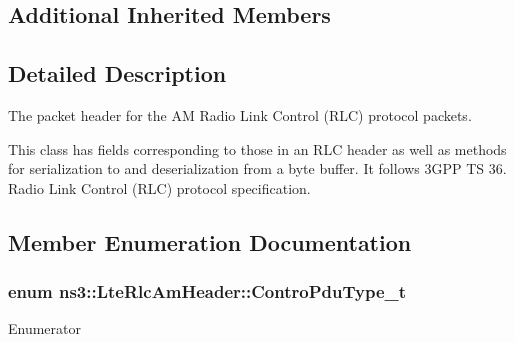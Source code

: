 \subsection*{Additional Inherited Members}


\subsection{Detailed Description}
The packet header for the AM Radio Link Control (R\+LC) protocol packets. 

This class has fields corresponding to those in an R\+LC header as well as methods for serialization to and deserialization from a byte buffer. It follows 3\+G\+PP TS 36. Radio Link Control (R\+LC) protocol specification. 

\subsection{Member Enumeration Documentation}
\subsubsection[{\texorpdfstring{Contro\+Pdu\+Type\+\_\+t}{ControPduType_t}}]{\setlength{\rightskip}{0pt plus 5cm}enum {\bf ns3\+::\+Lte\+Rlc\+Am\+Header\+::\+Contro\+Pdu\+Type\+\_\+t}}\hypertarget{classns3_1_1LteRlcAmHeader_a91ebd7f63ef09e33d7755c660add464e}{}\label{classns3_1_1LteRlcAmHeader_a91ebd7f63ef09e33d7755c660add464e}
\begin{Desc}
\item[Enumerator]\par
\begin{description}
\item[{\em 
S\+T\+A\+T\+U\+S\+\_\+\+P\+DU\hypertarget{classns3_1_1LteRlcAmHeader_a91ebd7f63ef09e33d7755c660add464ea2d662e6a06cefca8c790c83cc2f5ed95}{}\label{classns3_1_1LteRlcAmHeader_a91ebd7f63ef09e33d7755c660add464ea2d662e6a06cefca8c790c83cc2f5ed95}
}]\end{description}
\end{Desc}

